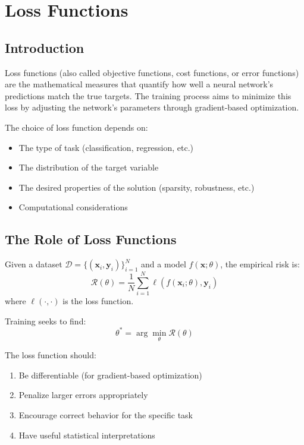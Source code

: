 ﻿\clearpage
\cleardoublepage

\chapter{Loss Functions}

\section{Introduction}

Loss functions (also called objective functions, cost functions, or error functions) are the mathematical measures that quantify how well a neural network's predictions match the true targets. The training process aims to minimize this loss by adjusting the network's parameters through gradient-based optimization.

The choice of loss function depends on:
\begin{itemize}
    \item The type of task (classification, regression, etc.)
    \item The distribution of the target variable
    \item The desired properties of the solution (sparsity, robustness, etc.)
    \item Computational considerations
\end{itemize}

\section{The Role of Loss Functions}

Given a dataset $\mathcal{D} = \{(\mathbf{x}_i, \mathbf{y}_i)\}_{i=1}^{N}$ and a model $f(\mathbf{x}; \theta)$, the empirical risk is:
\begin{equation}
\mathcal{R}(\theta) = \frac{1}{N}\sum_{i=1}^{N} \ell(f(\mathbf{x}_i; \theta), \mathbf{y}_i)
\end{equation}
where $\ell(\cdot, \cdot)$ is the loss function.

Training seeks to find:
\begin{equation}
\theta^* = \arg\min_{\theta} \mathcal{R}(\theta)
\end{equation}

The loss function should:
\begin{enumerate}
    \item Be differentiable (for gradient-based optimization)
    \item Penalize larger errors appropriately
    \item Encourage correct behavior for the specific task
    \item Have useful statistical interpretations
\end{enumerate}

